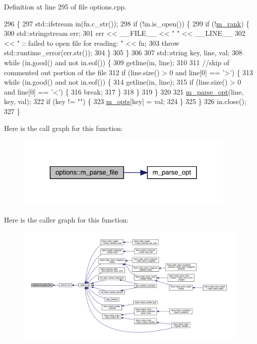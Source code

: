 Definition at line 295 of file options.\+cpp.


\begin{DoxyCode}
296 \{
297   std::ifstream in(fn.c\_str());
298   \textcolor{keywordflow}{if} (!in.is\_open()) \{
299     \textcolor{keywordflow}{if} (!\hyperlink{classoptions_a3171bb61cdfcc5a6a899ad6fe9b56f9d}{m\_rank}) \{
300       std::stringstream err;
301       err << \_\_FILE\_\_ << \textcolor{stringliteral}{" "} << \_\_LINE\_\_
302           << \textcolor{stringliteral}{" :: failed to open file for reading: "} << fn;
303       \textcolor{keywordflow}{throw} std::runtime\_error(err.str());
304     \}
305   \}
306 
307   std::string key, line, val;
308   \textcolor{keywordflow}{while} (in.good() and not in.eof()) \{
309     getline(in, line);
310 
311     \textcolor{comment}{//skip of commented out portion of the file}
312     \textcolor{keywordflow}{if} (line.size() > 0 and line[0] == \textcolor{charliteral}{'>'}) \{
313       \textcolor{keywordflow}{while} (in.good() and not in.eof()) \{
314         getline(in, line);
315         \textcolor{keywordflow}{if} (line.size() > 0 and line[0] == \textcolor{charliteral}{'<'}) \{
316           \textcolor{keywordflow}{break};
317         \}
318       \}
319     \}
320 
321     \hyperlink{options_8cpp_a18f37a1b6f36c00656e52d130c2132d2}{m\_parse\_opt}(line, key, val);
322     \textcolor{keywordflow}{if} (key != \textcolor{stringliteral}{""}) \{
323       \hyperlink{classoptions_ac73507ca925d98ee5ff6f04937dff5c3}{m\_opts}[key] = val;
324     \}
325   \}
326   in.close();
327 \}
\end{DoxyCode}
Here is the call graph for this function\+:\nopagebreak
\begin{figure}[H]
\begin{center}
\leavevmode
\includegraphics[width=301pt]{classoptions_abeab2c3e2cf5c1809e09601a3835d967_cgraph}
\end{center}
\end{figure}
Here is the caller graph for this function\+:\nopagebreak
\begin{figure}[H]
\begin{center}
\leavevmode
\includegraphics[width=350pt]{classoptions_abeab2c3e2cf5c1809e09601a3835d967_icgraph}
\end{center}
\end{figure}
